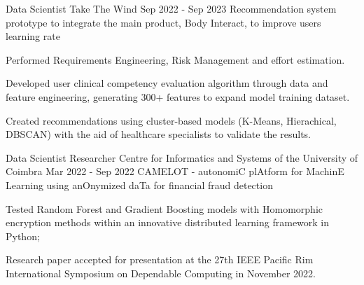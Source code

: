 \begin{cventries}
  \cventry
    {Data Scientist} %
    {Take The Wind} %
    {} %
    {Sep 2022 - Sep 2023} %
    {Recommendation system prototype to integrate the main product, Body Interact, to improve users learning rate} %
    {
    \begin{cvitems} %
     \item {Performed Requirements Engineering, Risk Management and effort estimation.}
      \item {Developed user clinical competency evaluation algorithm through data and feature engineering, generating 300+ features to expand model training dataset.}
      \item {Created recommendations using cluster-based models (K-Means, Hierachical, DBSCAN) with the aid of healthcare specialists to validate the results.}
      \end{cvitems}
    }

  \cventry
    {Data Scientist Researcher} %
    {Centre for Informatics and Systems of the University of Coimbra} %
    {} %
    {Mar 2022 - Sep 2022} %
    {CAMELOT - autonomiC plAtform for MachinE Learning using anOnymized daTa for financial fraud detection} %
    {
      \begin{cvitems} %
        \item {Tested Random Forest and Gradient Boosting models with Homomorphic encryption methods within an innovative distributed learning framework in Python;}
        \item {Research paper accepted for presentation at the 27th IEEE Pacific Rim International Symposium on Dependable Computing in November 2022.}
      \end{cvitems}
    }

\end{cventries}

